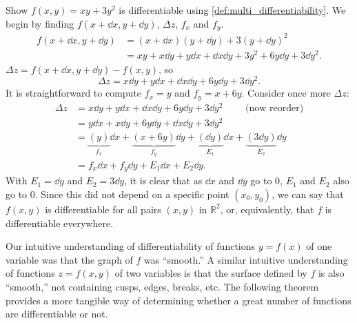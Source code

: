 \begin{example}\label{ex_totaldiff1}
Show $f(x,y) = xy+3y^2$ is differentiable using \autoref{def:multi_differentiability}.
\solution
We begin by finding $f(x+\dd x,y+\dd y)$, $\Delta z$, $f_x$ and $f_y$.
\begin{align*}
f(x+\dd x,y+\dd y) &= (x+\dd x)(y+\dd y) + 3(y+\dd y)^2 \\
						&= xy + x\dd y+y\dd x+\dd x \dd y + 3y^2+6y\dd y+3\dd y^2.
\end{align*}
$\Delta z = f(x+\dd x,y+\dd y) - f(x,y)$, so
\[\Delta z = x\dd y + y\dd x + \dd x \dd y + 6y\dd y+3\dd y^2.\]
It is straightforward to compute $f_x = y$ and $f_y = x+6y$. Consider once more $\Delta z$:
\begin{align*}
\Delta z &= x\dd y + y\dd x + \dd x \dd y + 6y\dd y+3\dd y^2 \qquad \text{ (now reorder)}\\
		&= y\dd x + x\dd y+6y\dd y+ \dd x \dd y + 3\dd y^2\\
		&= \underbrace{(y)}_{f_x}\dd x + \underbrace{(x+6y)}_{f_y}\dd y + \underbrace{(\dd y)}_{E_1}\dd x+\underbrace{(3\dd y)}_{E_2}\dd y\\
		&= f_x\dd x + f_y\dd y + E_1\dd x+E_2\dd y.
\end{align*}
With $E_1 = \dd y$ and $E_2 = 3\dd y$, it is clear that as $\dd x$ and $\dd y$ go to 0, $E_1$ and $E_2$ also go to 0. Since this did not depend on a specific point $(x_0,y_0)$, we can say that $f(x,y)$ is differentiable for all pairs $(x,y)$ in $\mathbb{R}^2$, or, equivalently, that $f$ is differentiable everywhere.
\end{example}

Our intuitive understanding of differentiability of functions $y=f(x)$ of one variable was that the graph of $f$ was ``smooth.'' A similar intuitive understanding of functions $z=f(x,y)$ of two variables is that the surface defined by $f$ is also ``smooth,'' not containing cusps, edges, breaks,  etc. The following theorem
provides a more tangible way of determining whether a great number of functions are differentiable or not.


